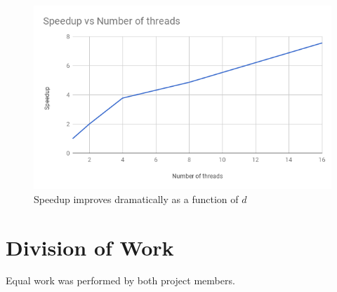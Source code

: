 \documentclass[12pt]{article}
\begin{document}
\begin{figure}[ht]
\centering
\label{speedup-vs-threads}
\includegraphics[scale=0.7]{speedup-vs-threads}
\caption{Speedup improves dramatically as a function of $d$}
\end{figure}

\section{Division of Work}
Equal work was performed by both project members. 

\nocite{talukdar2014scaling}
\nocite{talukdar2009new}



\end{document}
